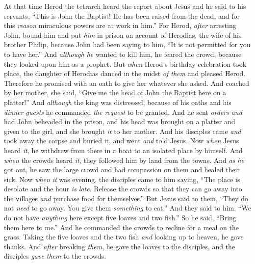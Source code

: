\begin{biblechapter} %
 At that time Herod the tetrarch heard the report about Jesus
\verse and he said to his servants, “This is John the Baptist! He has been raised from the dead, and for this \textit{reason} miraculous powers are at work in him.”
\verse For Herod, \textit{after} arresting John, bound him and put \textit{him} in prison on account of Herodias, the wife of his brother Philip,
\verse because John had been saying to him, “It is not permitted for you to have her.”
\verse And \textit{although he} wanted to kill him, he feared the crowd, because they looked upon him as a prophet.
\verse But \textit{when} Herod’s birthday celebration took place, the daughter of Herodias danced in the midst \textit{of them} and pleased Herod.
\verse Therefore he promised with an oath to give her whatever she asked.
\verse And coached by her mother, she said, “Give me the head of John the Baptist here on a platter!”
\verse And \textit{although} the king was distressed, because of his oaths and his \textit{dinner guests} he commanded \textit{the request} to be granted.
\verse And he sent \textit{orders} \textit{and} had John beheaded in the prison,
\verse and his head was brought on a platter and given to the girl, and she brought \textit{it} to her mother.
\verse And his disciples came \textit{and} took away the corpse and buried it, and went \textit{and} told Jesus.
 Now \textit{when} Jesus heard \textit{it}, he withdrew from there in a boat to an isolated place by himself. And \textit{when} the crowds heard \textit{it}, they followed him by land from the towns.
\verse And \textit{as he} got out, he saw the large crowd and had compassion on them and healed their sick.
\verse Now \textit{when it} was evening, the disciples came to him saying, “The place is desolate and the hour \textit{is late}. Release the crowds so that they can go away into the villages \textit{and} purchase food for themselves.”
\verse But Jesus said to them, “They do not \textit{need} to go away. You give them \textit{something} to eat.”
\verse And they said to him, “We do not have \textit{anything} here except five loaves and two fish.”
\verse So he said, “Bring them here to me.”
\verse And he commanded the crowds to recline for a meal on the grass. Taking the five loaves and the two fish \textit{and} looking up to heaven, he gave thanks. And \textit{after} breaking \textit{them}, he gave the loaves to the disciples, and the disciples \textit{gave them} to the crowds.

\end{biblechapter}
